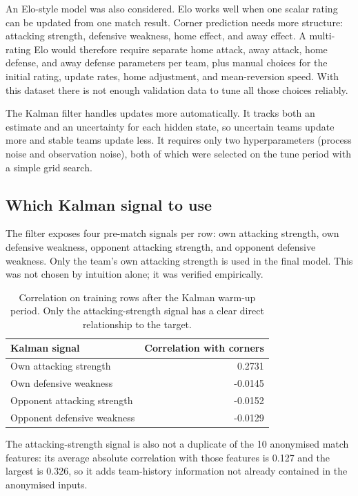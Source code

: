 \documentclass[11pt]{article}
\begin{document}
An Elo-style model was also considered. Elo works well when one scalar rating
can be updated from one match result. Corner prediction needs more structure:
attacking strength, defensive weakness, home effect, and away effect. A
multi-rating Elo would therefore require separate home attack, away attack,
home defense, and away defense parameters per team, plus manual choices for the
initial rating, update rates, home adjustment, and mean-reversion speed. With
this dataset there is not enough validation data to tune all those choices
reliably.

The Kalman filter handles updates more automatically. It tracks both an
estimate and an uncertainty for each hidden state, so uncertain teams update
more and stable teams update less. It requires only two hyperparameters
(process noise and observation noise), both of which were selected on the tune
period with a simple grid search.

\subsection{Which Kalman signal to use}

The filter exposes four pre-match signals per row: own attacking strength, own
defensive weakness, opponent attacking strength, and opponent defensive
weakness. Only the team's own attacking strength is used in the final model.
This was not chosen by intuition alone; it was verified empirically.

\begin{table}[h]
\centering
\begin{tabular}{lr}
\toprule
Kalman signal & Correlation with corners \\
\midrule
Own attacking strength & 0.2731 \\
Own defensive weakness & -0.0145 \\
Opponent attacking strength & -0.0152 \\
Opponent defensive weakness & -0.0129 \\
\bottomrule
\end{tabular}
\caption{Correlation on training rows after the Kalman warm-up period. Only
the attacking-strength signal has a clear direct relationship to the target.}
\end{table}

The attacking-strength signal is also not a duplicate of the 10 anonymised
match features: its average absolute correlation with those features is 0.127
and the largest is 0.326, so it adds team-history information not already
contained in the anonymised inputs.
\end{document}
